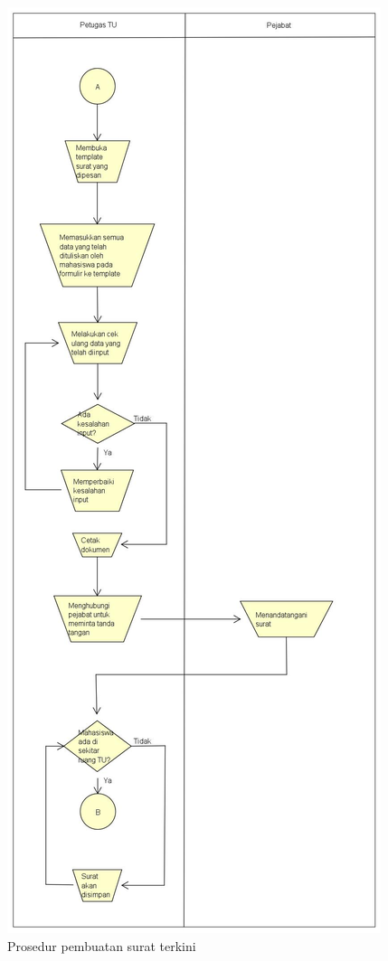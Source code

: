 \begin{figure}[H]
	\centering
		\includegraphics[scale=0.25]{Gambar/Diagram/sistem_terkini/work_flow/pembuatan_terkini.jpg}
	{\caption{Prosedur pembuatan surat terkini}}
	\label{fig:pembuatan_terkini}
\end{figure}

